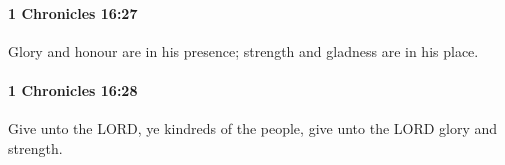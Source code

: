 		\paragraph{1 Chronicles 16:27} %
			\label{1CHRONICLES-16-27}

			Glory and honour are in his presence; strength and gladness are in his place.


		\paragraph{1 Chronicles 16:28} %
			\label{1CHRONICLES-16-28}

			Give unto the LORD, ye kindreds of the people, give unto the LORD glory and strength.


